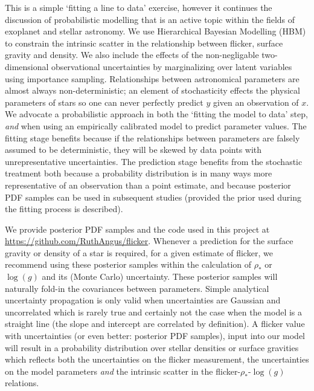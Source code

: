 This is a simple `fitting a line to data' exercise, however it continues the
discussion of probabilistic modelling that is an active topic within the
fields of exoplanet and stellar astronomy.
We use Hierarchical Bayesian Modelling (HBM) to constrain the intrinsic
scatter in the relationship between flicker, surface gravity and density.
We also include the effects of the non-negligable two-dimensional observational
uncertainties by marginalizing over latent variables using importance sampling.
Relationships between astronomical parameters are almost always
non-deterministic; an element of stochasticity effects the physical parameters
of stars so one can never perfectly predict $y$ given an observation of $x$.
We advocate a probabilistic approach in both the `fitting the model to data'
step, {\it and} when using an empirically calibrated model to predict
parameter values.
The fitting stage benefits because if the relationships between parameters are
falsely assumed to be deterministic, they will be skewed by data points with
unrepresentative uncertainties.
The prediction stage benefits from the stochastic treatment both because a
probability distribution is in many ways more representative of an observation
than a point estimate, and because posterior PDF samples can be used in
subsequent studies (provided the prior used during the fitting process is
described).

We provide posterior PDF samples and the code used in this project at
\url{https://github.com/RuthAngus/flicker}.
Whenever a prediction for the surface gravity or density of a star is required,
for a given estimate of flicker, we recommend using these posterior samples
within the calculation of $\rho_{*}$ or $\log(g)$ and its (Monte Carlo)
uncertainty.
These posterior samples will naturally fold-in the covariances between
parameters.
Simple analytical uncertainty propagation is only valid when uncertainties are
Gaussian and uncorrelated which is rarely true and certainly not the case when
the model is a straight line (the slope and intercept are correlated by
definition).
A flicker value with uncertainties (or even better: posterior PDF
samples), input into our model will result in a probability distribution over
stellar densities or surface gravities which reflects both the uncertainties
on the flicker measurement, the uncertainties on the model parameters {\it and}
the intrinsic scatter in the flicker-$\rho_{*}$-$\log(g)$ relations.

